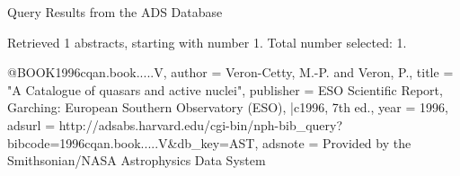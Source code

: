 Query Results from the ADS Database


Retrieved 1 abstracts, starting with number 1.  Total number selected: 1.

@BOOK{1996cqan.book.....V,
   author = {{Veron-Cetty}, M.-P. and {Veron}, P.},
    title = "{A Catalogue of quasars and active nuclei}",
publisher = {ESO Scientific Report, Garching: European Southern Observatory (ESO), |c1996, 7th ed.},
     year = 1996,
   adsurl = {http://adsabs.harvard.edu/cgi-bin/nph-bib_query?bibcode=1996cqan.book.....V&db_key=AST},
  adsnote = {Provided by the Smithsonian/NASA Astrophysics Data System}
}


